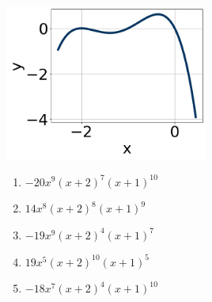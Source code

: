 \documentclass[14pt]{extbook}
\begin{document}
\begin{enumerate}
{\begin{center}
    \includegraphics[width=0.5\textwidth]{../Figures/polyGraphToFunctionB.png}
\end{center}
\begin{enumerate}[label=\Alph*.]
\item \( -20x^{9} (x + 2)^{7} (x + 1)^{10} \)
\item \( 14x^{8} (x + 2)^{8} (x + 1)^{9} \)
\item \( -19x^{9} (x + 2)^{4} (x + 1)^{7} \)
\item \( 19x^{5} (x + 2)^{10} (x + 1)^{5} \)
\item \( -18x^{7} (x + 2)^{4} (x + 1)^{10} \)

\end{enumerate} }
\end{enumerate}
\end{document}
